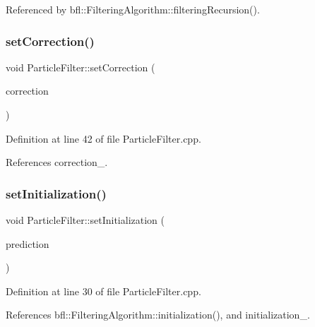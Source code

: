 Referenced by bfl\+::\+Filtering\+Algorithm\+::filtering\+Recursion().

\mbox{\label{classbfl_1_1ParticleFilter_a3d2935addf4481325a3fe8b99fe4d07a}} 
\subsubsection{\texorpdfstring{set\+Correction()}{setCorrection()}}
{\footnotesize\ttfamily void Particle\+Filter\+::set\+Correction (\begin{DoxyParamCaption}\item[{std\+::unique\+\_\+ptr$<$ \mbox{\hyperlink{classbfl_1_1PFCorrection}{P\+F\+Correction}} $>$}]{correction }\end{DoxyParamCaption})}



Definition at line 42 of file Particle\+Filter.\+cpp.



References correction\+\_\+.

\mbox{\label{classbfl_1_1ParticleFilter_abfeb75fd575802f362039c26169eed8b}} 
\subsubsection{\texorpdfstring{set\+Initialization()}{setInitialization()}}
{\footnotesize\ttfamily void Particle\+Filter\+::set\+Initialization (\begin{DoxyParamCaption}\item[{std\+::unique\+\_\+ptr$<$ \mbox{\hyperlink{classbfl_1_1Initialization}{Initialization}} $>$}]{prediction }\end{DoxyParamCaption})}



Definition at line 30 of file Particle\+Filter.\+cpp.



References bfl\+::\+Filtering\+Algorithm\+::initialization(), and initialization\+\_\+.

